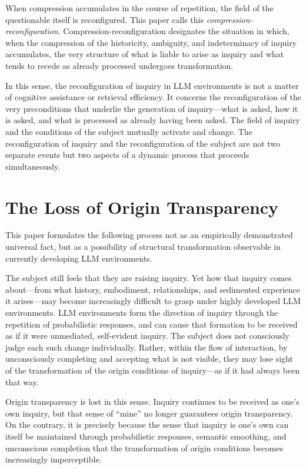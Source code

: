 \documentclass[12pt]{article}
\begin{document}
When compression accumulates in the course of repetition, the field of the questionable itself is reconfigured. This paper calls this \textit{compression-reconfiguration}. Compression-reconfiguration designates the situation in which, when the compression of the historicity, ambiguity, and indeterminacy of inquiry accumulates, the very structure of what is liable to arise as inquiry and what tends to recede as already processed undergoes transformation.

In this sense, the reconfiguration of inquiry in LLM environments is not a matter of cognitive assistance or retrieval efficiency. It concerns the reconfiguration of the very preconditions that underlie the generation of inquiry---what is asked, how it is asked, and what is processed as already having been asked. The field of inquiry and the conditions of the subject mutually activate and change. The reconfiguration of inquiry and the reconfiguration of the subject are not two separate events but two aspects of a dynamic process that proceeds simultaneously.

\section{The Loss of Origin Transparency}

This paper formulates the following process not as an empirically demonstrated universal fact, but as a possibility of structural transformation observable in currently developing LLM environments.

The subject still feels that they are raising inquiry. Yet how that inquiry comes about---from what history, embodiment, relationships, and sedimented experience it arises---may become increasingly difficult to grasp under highly developed LLM environments. LLM environments form the direction of inquiry through the repetition of probabilistic responses, and can cause that formation to be received as if it were unmediated, self-evident inquiry. The subject does not consciously judge each such change individually. Rather, within the flow of interaction, by unconsciously completing and accepting what is not visible, they may lose sight of the transformation of the origin conditions of inquiry---as if it had always been that way.

Origin transparency is lost in this sense. Inquiry continues to be received as one's own inquiry, but that sense of ``mine'' no longer guarantees origin transparency. On the contrary, it is precisely because the sense that inquiry is one's own can itself be maintained through probabilistic responses, semantic smoothing, and unconscious completion that the transformation of origin conditions becomes increasingly imperceptible.
\end{document}
